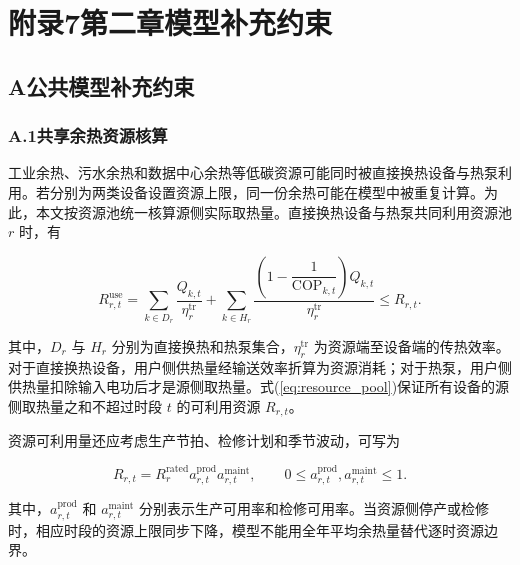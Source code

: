 \clearpage
\section*{附录7\quad 第二章模型补充约束}
{}
\renewcommand{\thechaptertwosupplement}{7.\Alph{chaptertwosupplement}}
\subsection*{A\quad 公共模型补充约束}
\label{app:common}

\subsubsection*{A.1\quad 共享余热资源核算}

工业余热、污水余热和数据中心余热等低碳资源可能同时被直接换热设备与热泵利用。若分别为两类设备设置资源上限，同一份余热可能在模型中被重复计算。为此，本文按资源池统一核算源侧实际取热量。直接换热设备与热泵共同利用资源池 $r$ 时，有

\begin{equation}
R_{r,t}^{\mathrm{use}}
=\sum_{k\in D_r}\frac{Q_{k,t}}{\eta_r^{\mathrm{tr}}}
+\sum_{k\in H_r}
\frac{\left(1-\dfrac{1}{\mathrm{COP}_{k,t}}\right)Q_{k,t}}
{\eta_r^{\mathrm{tr}}}
\leq R_{r,t}.
\label{eq:resource_pool}
\end{equation}

其中，$D_r$ 与 $H_r$ 分别为直接换热和热泵集合，$\eta_r^{\mathrm{tr}}$ 为资源端至设备端的传热效率。对于直接换热设备，用户侧供热量经输送效率折算为资源消耗；对于热泵，用户侧供热量扣除输入电功后才是源侧取热量。式(\ref{eq:resource_pool})保证所有设备的源侧取热量之和不超过时段 $t$ 的可利用资源 $R_{r,t}$。

资源可利用量还应考虑生产节拍、检修计划和季节波动，可写为

\begin{equation}
R_{r,t}=R_r^{\mathrm{rated}}a_{r,t}^{\mathrm{prod}}a_{r,t}^{\mathrm{maint}},
\qquad
0\leq a_{r,t}^{\mathrm{prod}},a_{r,t}^{\mathrm{maint}}\leq1.
\label{eq:resource_availability}
\end{equation}

其中，$a_{r,t}^{\mathrm{prod}}$ 和 $a_{r,t}^{\mathrm{maint}}$ 分别表示生产可用率和检修可用率。当资源侧停产或检修时，相应时段的资源上限同步下降，模型不能用全年平均余热量替代逐时资源边界。


